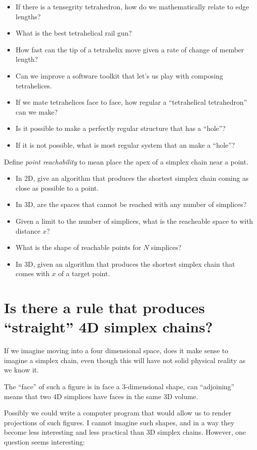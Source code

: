 \documentclass[11pt]{article}
\begin{document}
\begin{itemize}
\item If there is a tensegrity tetrahedron, how do we mathematically relate to edge lengths?
\item What is the best tetrahelical rail gun?
\item How fast can the tip of a tetrahelix move given a rate of change of member length?
\item Can we improve a software toolkit that let's us play with composing tetrahelices.
\item If we mate tetrahelices face to face, how regular a ``tetrahelical tetrahedron'' can we make?
\item Is it possible to make a perfectly regular structure that has a ``hole''?
\item If it is not possible, what is most regular system that an make a ``hole''?
\end{itemize}

Define {\em point reachability} to mean place the apex of a simplex chain near a point.
\begin{itemize}
\item In 2D, give an algorithm that produces the shortest simplex chain coming as close as possible to a point.
\item In 3D, are the spaces that cannot be reached with any number of simplices?
\item Given a limit to the number of simplices, what is the reacheable space to with distance $x$?
\item What is the shape of reachable points for $N$ simplices?
  \item In 3D, given an algorithm that produces the shortest simplex chain that comes with $x$ of a target point.
  \end{itemize}


\section{Is there a rule that produces ``straight'' 4D simplex chains?}

If we imagine moving into a four dimensional space, does it make sense to imagine a simplex chain, even though this will have
not solid physical reality as we know it.

The ``face'' of such a figure is in face a 3-dimensional shape, can ``adjoining'' means that two 4D simplices have faces in the same 3D volume.

Possibly we could write a computer program that would allow us to render projections of such figures.
I cannot imagine such shapes, and in a way they become less interesting and less practical than 3D simplex chains.
However, one question seems interesting:
\end{document}
